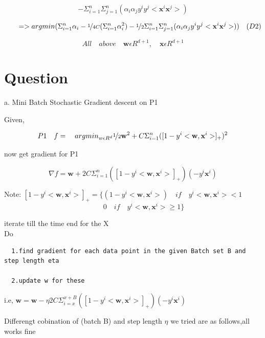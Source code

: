\documentclass{article}
\begin{document}
 \[ - \Sigma _{i=1} ^n \Sigma _{j=1} ^n ( \alpha _i \alpha _j y^i y^j< \textbf{x}^i \textbf{x}^j>) \] 
 


 \[ \qquad => argmin(\Sigma _{i=1} ^n \alpha _i - \nicefrac{1}{4C} (\Sigma _{i=1} ^n  \alpha _i ^2) - \nicefrac{1}{2}\Sigma _{i=1} ^n \Sigma _{j=1} ^n ( \alpha _i \alpha _j y^i y^j< \textbf{x}^i \textbf{x}^j>)) \quad (D2) \]

\[ All \quad above \quad \textbf{w} \epsilon R ^{d+1} , \quad \textbf{x} \epsilon R ^{d+1} \]



\section{Question}



a. Mini Batch Stochastic Gradient descent on P1

Given,

	\[ P1 \quad f = \quad argmin _{ w \epsilon R^d } \nicefrac{1}{2} \textbf{w} ^2  + C \Sigma _{i=1} ^n  ([ 1 - y^i < \textbf{w} ,  \textbf{x} ^i > ]_+)^2   \]

now  get gradient for P1 

\[  \nabla f =  \textbf{w}  + 2 C \Sigma _{i=1} ^n  ([ 1 - y^i <\textbf{w} ,  \textbf{x} ^i> ]_+)(-y^i \textbf{x}^i) \]

\medskip

Note: $ [ 1 - y^i <\textbf{w} ,  \textbf{x} ^i> ]_+ = \{ ( 1 - y^i <\textbf{w} ,  \textbf{x} ^i> ) \quad if \quad y^i <\textbf{w} ,  \textbf{x} ^i> < 1 $ \\
\[ \quad \qquad  0 \quad if \quad y^i <\textbf{w} ,  \textbf{x} ^i> \geq 1 \} \] 

iterate till the time end for the X
\\

Do
\begin{verbatim}
  1.find gradient for each data point in the given Batch set B and step length eta  
  
  2.update w for these 
  \end{verbatim} 
   i.e,     $ \textbf{w} = \textbf{w} - \eta 2 C \Sigma _{i=x} ^{x+B}  ([ 1 - y^i <\textbf{w} ,  \textbf{x} ^i> ]_+)(-y^i \textbf{x}^i)$
 

Differengt cobination of (batch B) and step length $ \eta $ we tried are as follows,all works fine
\end{document}
